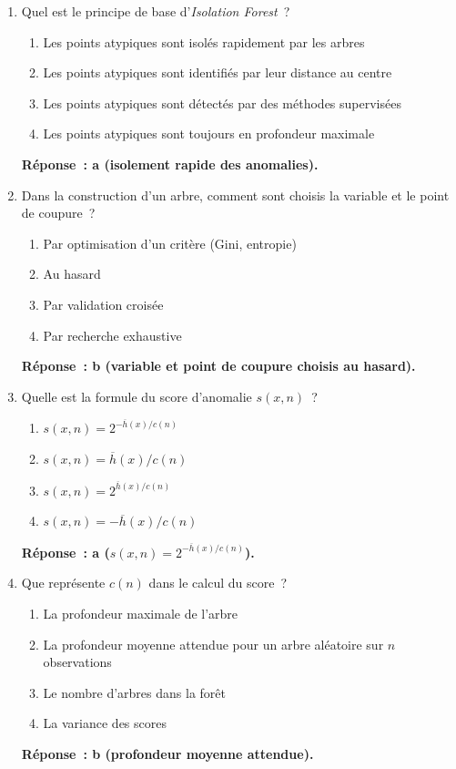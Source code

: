\documentclass[a4paper,11pt]{article}
\theoremstyle{definition}
\theoremstyle{remark}
\begin{document}
\begin{enumerate}

  \item Quel est le principe de base d'\emph{Isolation Forest}~?
    \begin{enumerate}
      \item Les points atypiques sont isol\'es rapidement par les arbres
      \item Les points atypiques sont identifi\'es par leur distance au centre
      \item Les points atypiques sont d\'etect\'es par des m\'ethodes
        supervis\'ees
      \item Les points atypiques sont toujours en profondeur maximale
    \end{enumerate}
    \textbf{R\'eponse~: a (isolement rapide des anomalies).}

  \item Dans la construction d'un arbre, comment sont choisis la variable
    et le point de coupure~?
    \begin{enumerate}
      \item Par optimisation d'un crit\`ere (Gini, entropie)
      \item Au hasard
      \item Par validation crois\'ee
      \item Par recherche exhaustive
    \end{enumerate}
    \textbf{R\'eponse~: b (variable et point de coupure choisis au hasard).}

  \item Quelle est la formule du score d'anomalie $s(x,n)$~?
    \begin{enumerate}
      \item $s(x,n) = 2^{-\overline{h}(x)/c(n)}$
      \item $s(x,n) = \overline{h}(x)/c(n)$
      \item $s(x,n) = 2^{\overline{h}(x)/c(n)}$
      \item $s(x,n) = -\overline{h}(x)/c(n)$
    \end{enumerate}
    \textbf{R\'eponse~: a ($s(x,n) = 2^{-\overline{h}(x)/c(n)}$).}

  \item Que repr\'esente $c(n)$ dans le calcul du score~?
    \begin{enumerate}
      \item La profondeur maximale de l'arbre
      \item La profondeur moyenne attendue pour un arbre al\'eatoire
        sur $n$ observations
      \item Le nombre d'arbres dans la for\^et
      \item La variance des scores
    \end{enumerate}
    \textbf{R\'eponse~: b (profondeur moyenne attendue).}


\end{enumerate}
\end{document}
